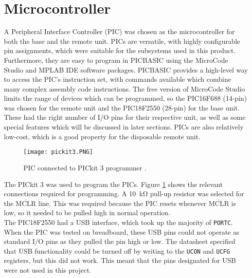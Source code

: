 \section{Microcontroller}
A Peripheral Interface Controller (PIC) was chosen as the microcontroller for both the base and the remote unit. PICs are versatile, with highly configurable pin assignments, which were suitable for the subsystems used in this product. Furthermore, they are easy to program in PICBASIC using the MicroCode Studio \cite{microcode_studio} and MPLAB IDE software packages. PICBASIC provides a high-level way to access the PIC's instruction set, with commands available which combine many complex assembly code instructions. The free version of MicroCode Studio limits the range of devices which can be programmed, so the PIC16F688 (14-pin) \cite{pic16f688} was chosen for the remote unit and the PIC18F2550 (28-pin) \cite{pic18f2550} for the base unit. These had the right number of I/O pins for their respective unit, as well as some special features which will be discussed in later sections. PICs are also relatively low-cost, which is a good property for the disposable remote unit.\\

\begin{figure}[htb]
	\centering
	\texttt{[image: pickit3.PNG]}
	\caption{PIC connected to PICkit 3 programmer \cite{pickit3}.}
	\label{fig: pickit3}
\end{figure}

The PICkit 3 \cite{pickit3} was used to program the PICs. Figure \ref{fig: pickit3} shows the relevant connections required for programming. A \SI{10}{\kilo\ohm} pull-up resistor was selected for the $\overline{\text{MCLR}}$ line. This was required because the PIC resets whenever $\overline{\text{MCLR}}$ is low, so it needed to be pulled high in normal operation. \\

The PIC18F2550 had a USB interface, which took up the majority of \verb|PORTC|. When the PIC was tested on breadboard, these USB pins could not operate as standard I/O pins as they pulled the pin high or low. The datasheet specified that USB functionality could be turned off by writing to the \verb|UCON| and \verb|UCFG| registers, but this did not work. This meant that the pins designated for USB were not used in this project.